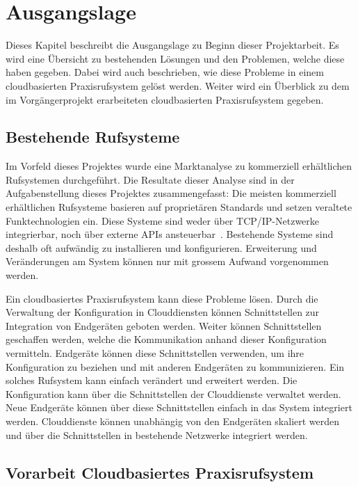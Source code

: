 \section{Ausgangslage}

Dieses Kapitel beschreibt die Ausgangslage zu Beginn dieser Projektarbeit.
Es wird eine Übersicht zu bestehenden Lösungen und den Problemen, welche diese haben gegeben.
Dabei wird auch beschrieben, wie diese Probleme in einem cloudbasierten Praxisrufsystem gelöst werden.
Weiter wird ein Überblick zu dem im Vorgängerprojekt erarbeiteten cloudbasierten Praxisrufsystem gegeben.

\subsection{Bestehende Rufsysteme}

Im Vorfeld dieses Projektes wurde eine Marktanalyse zu kommerziell erhältlichen Rufsystemen durchgeführt.
Die Resultate dieser Analyse sind in der Aufgabenstellung dieses Projektes zusammengefasst:
Die meisten kommerziell erhältlichen Rufsysteme basieren auf proprietären Standards und setzen veraltete Funktechnologien ein.
Diese Systeme sind weder über TCP/IP-Netzwerke integrierbar, noch über externe APIs ansteuerbar~\cite{aufgabenstellung}.
Bestehende Systeme sind deshalb oft aufwändig zu installieren und konfigurieren.
Erweiterung und Veränderungen am System können nur mit grossem Aufwand vorgenommen werden.

Ein cloudbasiertes Praxisrufsystem kann diese Probleme lösen.
Durch die Verwaltung der Konfiguration in Clouddiensten können Schnittstellen zur Integration von Endgeräten geboten werden.
Weiter können Schnittstellen geschaffen werden, welche die Kommunikation anhand dieser Konfiguration vermitteln.
Endgeräte können diese Schnittstellen verwenden, um ihre Konfiguration zu beziehen und mit anderen Endgeräten zu kommunizieren.
Ein solches Rufsystem kann einfach verändert und erweitert werden.
Die Konfiguration kann über die Schnittstellen der Clouddienste verwaltet werden.
Neue Endgeräte können über diese Schnittstellen einfach in das System integriert werden.
Clouddienste können unabhängig von den Endgeräten skaliert werden und über die Schnittstellen in bestehende Netzwerke integriert werden.

\subsection{Vorarbeit Cloudbasiertes Praxisrufsystem}

